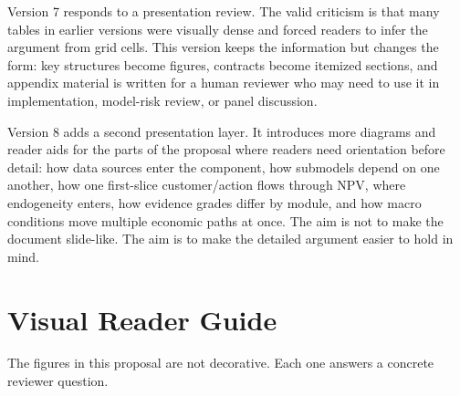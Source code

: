 \documentclass[11pt]{article}
\newcommand{\1}{\mathbf{1}}
\begin{document}
Version 7 responds to a presentation review. The valid criticism is that many
tables in earlier versions were visually dense and forced readers to infer the
argument from grid cells. This version keeps the information but changes the
form: key structures become figures, contracts become itemized sections, and
appendix material is written for a human reviewer who may need to use it in
implementation, model-risk review, or panel discussion.

Version 8 adds a second presentation layer. It introduces more diagrams and
reader aids for the parts of the proposal where readers need orientation before
detail: how data sources enter the component, how submodels depend on one
another, how one first-slice customer/action flows through NPV, where
endogeneity enters, how evidence grades differ by module, and how macro
conditions move multiple economic paths at once. The aim is not to make the
document slide-like. The aim is to make the detailed argument easier to hold in
mind.

\section*{Visual Reader Guide}

The figures in this proposal are not decorative. Each one answers a concrete
reviewer question.
\end{document}
